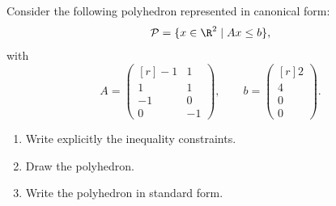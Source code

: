 

Consider the following polyhedron represented in canonical form:
\[
 \mathcal{P} = \{x \in \R^2 \mid Ax \leq b\},
\]
with
\[
 A = \begin{pmatrix*}[r] -1 &  1 \\  1 &  1 \\ -1 &  0 \\  0 & -1 \end{pmatrix*}, \qquad b = \begin{pmatrix*}[r] 2 \\ 4 \\ 0 \\ 0  \end{pmatrix*}. 
\]

\begin{enumerate}
    \item Write explicitly the inequality constraints.
    \item Draw the polyhedron.
    \item Write the polyhedron in standard form.
\end{enumerate}





